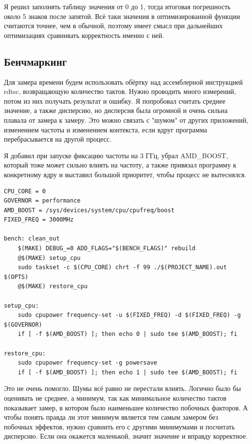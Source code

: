 \documentclass[12pt]{extarticle}
\begin{document}
Я решил заполнять таблицу значения от 0 до 1, тогда итоговая погрешность около 5 знаков после запятой. Всё таки значения в оптимизированной функции считаются точнее, чем в обычной, поэтому имеет смысл при дальнейших оптимизациях сравнивать корректность именно с ней.

\subsection{Бенчмаркинг}

Для замера времени будем использовать обёртку над ассемблерной инструкцией rdtsc, возвращающую количество тактов. Нужно проводить много измерений, потом из них получать результат и ошибку. Я попробовал считать среднее значение, а также дисперсию, но дисперсия была огромной и очень сильна плавала от замера к замеру. Это можно связать с "шумом" от других приложений, изменением частоты и изменением контекста, если вдруг программа перебрасывается на другой процесс. 

Я добавил при запуске фиксацию частоты на 3 ГГц, убрал AMD\_BOOST, который тоже может сильно влиять на частоту, а также привязал программу к конкретному ядру и выставил большой приоритет, чтобы процесс не вытеснялся.

\begin{lstlisting}[language=Make]
CPU_CORE = 0
GOVERNOR = performance
AMD_BOOST = /sys/devices/system/cpu/cpufreq/boost
FIXED_FREQ = 3000MHz 

bench: clean_out
	$(MAKE) DEBUG_=0 ADD_FLAGS="$(BENCH_FLAGS)" rebuild
	@$(MAKE) setup_cpu
	sudo taskset -c $(CPU_CORE) chrt -f 99 ./$(PROJECT_NAME).out $(OPTS)
	@$(MAKE) restore_cpu

setup_cpu:
	sudo cpupower frequency-set -u $(FIXED_FREQ) -d $(FIXED_FREQ) -g $(GOVERNOR)
	if [ -f $(AMD_BOOST) ]; then echo 0 | sudo tee $(AMD_BOOST); fi

restore_cpu:
	sudo cpupower frequency-set -g powersave
	if [ -f $(AMD_BOOST) ]; then echo 1 | sudo tee $(AMD_BOOST); fi
\end{lstlisting}

Это не очень помогло. Шумы всё равно не перестали влиять. Логично было бы оценивать не среднее, а минимум, так как минимальное количество тактов показывает замер, в котором было наименьшее количество побочных факторов. А чтобы понять правда ли этот минимум является тем самым замером без побочных эффектов, нужно сравнить его с другими минимумами и посчитать дисперсию. Если она окажется маленькой, значит значение и вправду корректное.  
\end{document}
